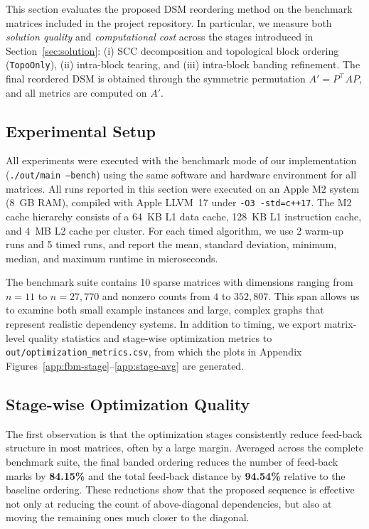 \documentclass[12pt]{article}
\theoremstyle{definition}
\begin{document}
This section evaluates the proposed DSM reordering method on the benchmark matrices included in the project repository. In particular, we measure both \emph{solution quality} and \emph{computational cost} across the stages introduced in Section~\ref{sec:solution}: (i) SCC decomposition and topological block ordering (\texttt{TopoOnly}), (ii) intra-block tearing, and (iii) intra-block banding refinement. The final reordered DSM is obtained through the symmetric permutation $A' = P^\top A P$, and all metrics are computed on $A'$.

\subsection{Experimental Setup}

All experiments were executed with the benchmark mode of our implementation (\texttt{./out/main --bench}) using the same software and hardware environment for all matrices. All runs reported in this section were executed on an Apple M2 system (8~GB RAM), compiled with Apple LLVM~17 under \texttt{-O3 -std=c++17}. The M2 cache hierarchy consists of a 64~KB L1 data cache, 128~KB L1 instruction cache, and 4~MB L2 cache per cluster. For each timed algorithm, we use 2 warm-up runs and 5 timed runs, and report the mean, standard deviation, minimum, median, and maximum runtime in microseconds.

The benchmark suite contains 10 sparse matrices with dimensions ranging from $n=11$ to $n=27{,}770$ and nonzero counts from $4$ to $352{,}807$. This span allows us to examine both small example instances and large, complex graphs that represent realistic dependency systems. In addition to timing, we export matrix-level quality statistics and stage-wise optimization metrics to \texttt{out/optimization\_metrics.csv}, from which the plots in Appendix Figures~\ref{app:fbm-stage}--\ref{app:stage-avg} are generated.

\subsection{Stage-wise Optimization Quality}

The first observation is that the optimization stages consistently reduce feed-back structure in most matrices, often by a large margin. Averaged across the complete benchmark suite, the final banded ordering reduces the number of feed-back marks by \textbf{84.15\%} and the total feed-back distance by \textbf{94.54\%} relative to the baseline ordering. These reductions show that the proposed sequence is effective not only at reducing the count of above-diagonal dependencies, but also at moving the remaining ones much closer to the diagonal.
\end{document}
